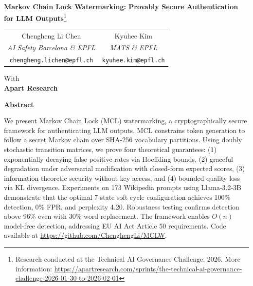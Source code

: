\documentclass[11pt]{article}
\theoremstyle{definition}
\theoremstyle{remark}
\begin{document}
\begin{center}
    {\LARGE \textbf{Markov Chain Lock Watermarking: Provably Secure Authentication for LLM Outputs}\footnote{Research conducted at the Technical AI Governance Challenge, 2026. More information: \url{https://apartresearch.com/sprints/the-technical-ai-governance-challenge-2026-01-30-to-2026-02-01}}}
    
    \vspace{1em}
    
    \begin{tabular}{cc}
        Chengheng Li Chen & Kyuhee Kim \\
        \textit{AI Safety Barcelona \& EPFL} & \textit{MATS \& EPFL} \\
        \texttt{chengheng.lichen@epfl.ch} & \texttt{kyuhee.kim@epfl.ch} \\
    \end{tabular}
    
    \vspace{0.5em}
    
    With \\
    \textbf{Apart Research}
\end{center}

\vspace{1em}

\begin{center}
    \textbf{Abstract}
\end{center}

\noindent
We present Markov Chain Lock (MCL) watermarking, a cryptographically secure framework for authenticating LLM outputs. MCL constrains token generation to follow a secret Markov chain over SHA-256 vocabulary partitions. Using doubly stochastic transition matrices, we prove four theoretical guarantees: (1) exponentially decaying false positive rates via Hoeffding bounds, (2) graceful degradation under adversarial modification with closed-form expected scores, (3) information-theoretic security without key access, and (4) bounded quality loss via KL divergence. Experiments on 173 Wikipedia prompts using Llama-3.2-3B demonstrate that the optimal 7-state soft cycle configuration achieves 100\% detection, 0\% FPR, and perplexity 4.20. Robustness testing confirms detection above 96\% even with 30\% word replacement. The framework enables $O(n)$ model-free detection, addressing EU AI Act Article 50 requirements. Code available at \url{https://github.com/ChenghengLi/MCLW}.
\end{document}
